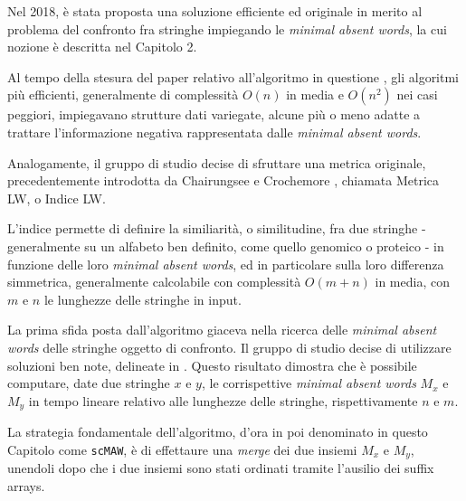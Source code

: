 Nel 2018, è stata proposta una soluzione efficiente ed originale in merito al problema del confronto fra stringhe impiegando le \textit{minimal absent words}, la cui nozione è descritta nel Capitolo 2. 

\vspace{3mm}

Al tempo della stesura del paper relativo all'algoritmo in questione \cite{scMAW}, gli algoritmi più efficienti, generalmente di complessità $O(n)$ in media e $O(n^2 )$ nei casi peggiori, impiegavano strutture dati variegate, alcune più o meno adatte a trattare l'informazione negativa rappresentata dalle \textit{minimal absent words}. 

\vspace{3mm}

Analogamente, il gruppo di studio decise di sfruttare una metrica originale, precedentemente introdotta da Chairungsee e Crochemore \cite{maw1}, chiamata Metrica LW, o Indice LW. 

\vspace{3mm}

L'indice permette di definire la similiarità, o similitudine, fra due stringhe - generalmente su un alfabeto ben definito, come quello genomico o proteico - in funzione delle loro \textit{minimal absent words}, ed in particolare sulla loro differenza simmetrica, generalmente calcolabile con complessità $O(m+n)$ in media, con $m$ e $n$ le lunghezze delle stringhe in input.

\vspace{3mm}

La prima sfida posta dall'algoritmo giaceva nella ricerca delle \textit{minimal absent words} delle stringhe oggetto di confronto. Il gruppo di studio decise di utilizzare soluzioni ben note, delineate in \cite{maw1}. Questo risultato dimostra che è possibile computare, date due stringhe $x$ e $y$, le corrispettive \textit{minimal absent words} $M_x$ e $M_y$ in tempo lineare relativo alle lunghezze delle stringhe, rispettivamente $n$ e $m$. 

\vspace{3mm}

La strategia fondamentale dell'algoritmo, d'ora in poi denominato in questo Capitolo come \verb|scMAW|, è di effettaure una \textit{merge} dei due insiemi $M_x$ e $M_y$, unendoli dopo che i due insiemi sono stati ordinati tramite l'ausilio dei suffix arrays. 

\vspace{3mm}

